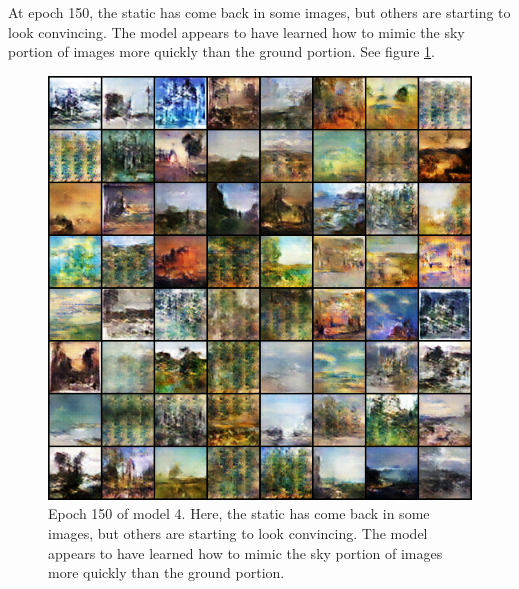 \documentclass[11pt,letterpaper]{article}
\begin{document}
				At epoch 150, the static has come back in some images, but others are starting to look convincing.
				The model appears to have learned how to mimic the sky portion of images more quickly than the ground portion.
				See figure \ref{fig:wa64:epoch150generator}.
				\begin{figure}
					\centering
					\includegraphics[width=1.0\linewidth]{results/model4/epoch150_generator}
					\caption{Epoch 150 of model 4. Here, the static has come back in some images, but others are starting to look convincing. The model appears to have learned how to mimic the sky portion of images more quickly than the ground portion.}
					\label{fig:wa64:epoch150generator}
				\end{figure}
\end{document}
